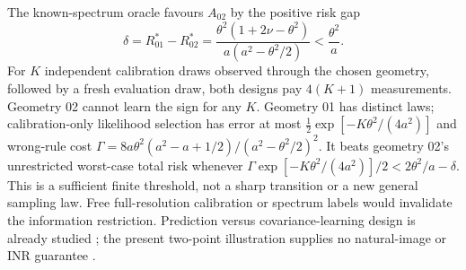 The known-spectrum oracle favours $A_{02}$ by the positive risk gap
\[
\delta=R^*_{01}-R^*_{02}
=\frac{\theta^2(1+2\nu-\theta^2)}{a(a^2-\theta^2/2)}
<\frac{\theta^2}{a}.
\]
For $K$ independent calibration draws observed through the chosen
geometry, followed by a fresh evaluation draw, both designs pay
$4(K+1)$ measurements. Geometry 02 cannot learn the sign for any $K$.
Geometry 01 has distinct laws; calibration-only likelihood selection
has error at most $\tfrac12\exp[-K\theta^2/(4a^2)]$ and wrong-rule cost
$\Gamma=8a\theta^2(a^2-a+1/2)/(a^2-\theta^2/2)^2$.
It beats geometry 02's unrestricted worst-case total risk whenever
$\Gamma\exp[-K\theta^2/(4a^2)]/2<2\theta^2/a-\delta$.
This is a sufficient finite threshold, not a sharp transition or a new
general sampling law. Free full-resolution calibration or spectrum
labels would invalidate the information restriction. Prediction versus
covariance-learning design is already studied \citep{zimmerman2006optimal};
the present two-point illustration supplies no natural-image or INR
guarantee .
